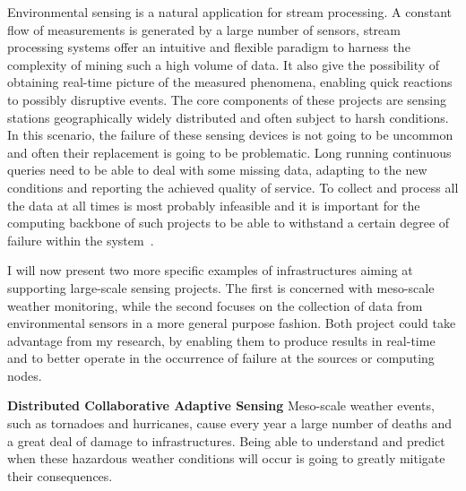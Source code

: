 Environmental sensing is a natural application for stream processing. A constant flow of measurements is
generated by a large number of sensors, stream processing systems offer an intuitive and flexible
paradigm to harness the complexity of mining such a high volume of data. It also give the possibility of
obtaining real-time picture of the measured phenomena, enabling quick reactions to possibly disruptive
events. The core components of these projects are sensing stations geographically widely distributed and
often subject to harsh conditions. In this scenario, the failure of these sensing devices is not going to
be uncommon and often their replacement is going to be problematic. Long running continuous queries need
to be able to deal with some missing data, adapting to the new conditions and reporting the achieved
quality of service. To collect and process all the data at all times is most probably infeasible and it
is important for the computing backbone of such projects to be able to withstand a certain degree of
failure within the system~\cite{dependable-is-sensing}.

I will now present two more specific examples of infrastructures aiming at supporting large-scale sensing
projects.  The first is concerned with meso-scale weather monitoring, while the second focuses on the
collection of data from environmental sensors in a more general purpose fashion. Both project could take
advantage from my research, by enabling them to produce results in real-time and to better operate in the
occurrence of failure at the sources or computing nodes.

\textbf{Distributed Collaborative Adaptive Sensing} Meso-scale weather events, such as tornadoes and
hurricanes, cause every year a large number of deaths and a great deal of damage to infrastructures.
Being able to understand and predict when these hazardous weather conditions will occur is going to
greatly mitigate their consequences.

